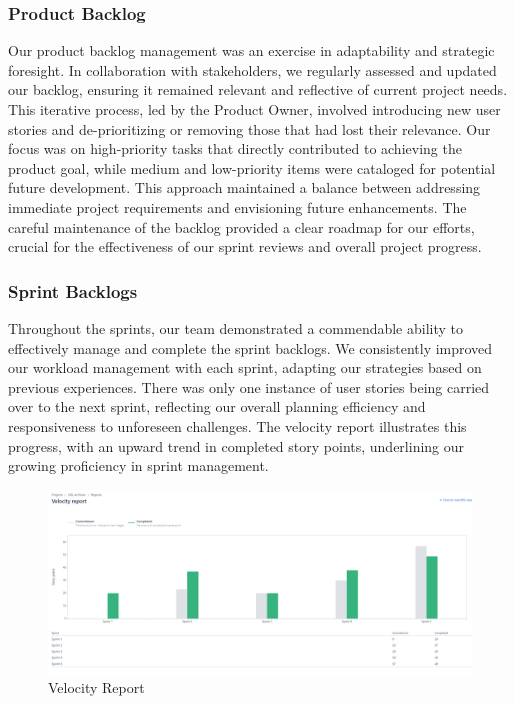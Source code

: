 \subsubsection{Product Backlog}
Our product backlog management was an exercise in adaptability and strategic foresight.
In collaboration with stakeholders, we regularly assessed and updated our backlog, ensuring it remained relevant and reflective of current project needs.
This iterative process, led by the Product Owner, involved introducing new user stories and de-prioritizing or removing those that had lost their relevance.
Our focus was on high-priority tasks that directly contributed to achieving the product goal, while medium and low-priority items were cataloged for potential future development.
This approach maintained a balance between addressing immediate project requirements and envisioning future enhancements.
The careful maintenance of the backlog provided a clear roadmap for our efforts, crucial for the effectiveness of our sprint reviews and overall project progress.

\subsubsection{Sprint Backlogs}
Throughout the sprints, our team demonstrated a commendable ability to effectively manage and complete the sprint backlogs.
We consistently improved our workload management with each sprint, adapting our strategies based on previous experiences.
There was only one instance of user stories being carried over to the next sprint, reflecting our overall planning efficiency and responsiveness to unforeseen challenges.
The velocity report illustrates this progress, with an upward trend in completed story points, underlining our growing proficiency in sprint management.
\begin{figure}[h!]
    \centering
    \includegraphics[width=1\textwidth]{pictures/Scrum/velocity_report}
    \caption{Velocity Report}
    \label{fig:velocity_report}
\end{figure}

